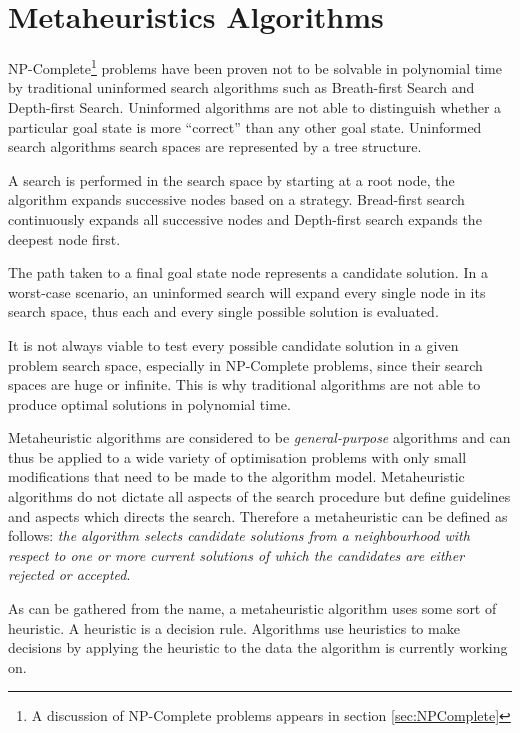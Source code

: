 \section{Metaheuristics Algorithms}
NP-Complete\footnote{A discussion of NP-Complete problems appears in section \ref{sec:NPComplete}} problems have been proven not to be solvable in polynomial time by traditional uninformed search algorithms such as Breath-first Search and Depth-first Search\cite{AIModernApproach}. 
Uninformed algorithms are not able to distinguish whether a particular goal state is more ``correct'' than any other goal state\cite{AIModernApproach}. Uninformed search algorithms search spaces are represented by a tree structure\cite{AIModernApproach}. 

A search is performed in the search space by starting at a root node, the algorithm expands successive nodes based on a strategy\cite{AIModernApproach}. Bread-first search continuously expands all successive nodes and Depth-first search expands the deepest node first\cite{AIModernApproach}.

The path taken to a final  goal state node represents a candidate solution\cite{AIModernApproach}. In a worst-case scenario, an uninformed search will expand every single node in its search space, thus each and every single possible solution is evaluated\cite{AIModernApproach}.

It is not always viable to test every possible candidate solution in a given problem search space, especially in NP-Complete problems, since their search spaces are huge or infinite. This is why traditional algorithms are not able to produce optimal solutions in polynomial time\cite{AIModernApproach}.

Metaheuristic algorithms are considered to be \emph{general-purpose} algorithms and can thus be applied to a wide variety of optimisation problems with only small modifications that need to be made to the algorithm model\cite{MetaGraph}.
Metaheuristic algorithms do not dictate all aspects of the search procedure but define guidelines and aspects which directs the search\cite{HandbookofMH}. Therefore a metaheuristic can be defined as follows: \emph{the algorithm selects candidate solutions from a neighbourhood with respect to one or more current solutions of which the candidates are either rejected or accepted}\cite{HandbookofMH}.

As can be gathered from the name, a metaheuristic algorithm uses some sort of heuristic. A heuristic is a decision rule. Algorithms use heuristics to make decisions by applying the heuristic to the data the algorithm is currently working on\cite{AIModernApproach,NatureInspiredMetaHeuristic}.

